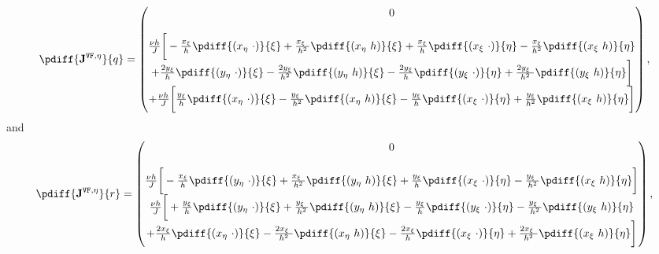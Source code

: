 \begin{align}
	\pdiff{\mathbf{J}^{\texttt{VF},\eta}}{q}=
		\begin{pmatrix}
	0 \\
	\\
	\frac{\nu h}{J} \bigg[
	- \frac{x_{\xi} }{h}\pdiff{(x_{\eta}\ \cdot)}{\xi}
	+ \frac{x_{\xi}\ }{h^2}\pdiff{(x_{\eta}\ h)}{\xi}
	+ \frac{x_{\xi}}{h} \pdiff{(x_{\xi}\ \cdot)}{\eta}
	- \frac{x_{\xi}}{h^2}\pdiff{(x_{\xi}\ h)}{\eta}\\
	+ \frac{2 y_{\xi}}{h} \pdiff{(y_{\eta}\ \cdot)}{\xi}
	- \frac{2 y_{\xi}}{h^2} \pdiff{(y_{\eta}\ h)}{\xi}
	- \frac{2 y_{\xi}}{h} \pdiff{(y_{\xi}\ \cdot)}{\eta}
	+ \frac{2 y_{\xi}\ }{h^2} \pdiff{(y_{\xi}\ h)}{\eta}
	\bigg]\\
	+\frac{\nu h}{J} \bigg[
	\frac{y_{\xi} }{h} \pdiff{(x_{\eta}\ \cdot)}{\xi}
	- \frac{y_{\xi}\ }{h^2} \pdiff{(x_{\eta}\ h)}{\xi}
	- \frac{y_{\xi}}{h} \pdiff{(x_{\xi}\ \cdot)}{\eta}
	+ \frac{y_{\xi}}{h^2} \pdiff{(x_{\xi}\ h)}{\eta}
	\bigg]
\end{pmatrix},
\end{align}
%
and
%
\begin{align}
	\pdiff{\mathbf{J}^{\texttt{VF},\eta}}{r}=
		\begin{pmatrix}
	0 \\
	\\
	\frac{\nu h}{J} \bigg[
	- \frac{x_{\xi}}{h} \pdiff{(y_{\eta}\ \cdot)}{\xi}
	+ \frac{x_{\xi}\ }{h^2}\pdiff{(y_{\eta}\ h)}{\xi}
	+ \frac{y_{\xi}}{h} \pdiff{(x_{\xi}\ \cdot)}{\eta}
	- \frac{y_{\xi}\ }{h^2} \pdiff{(x_{\xi}\ h)}{\eta}
	\bigg]\\
	\frac{\nu h}{J} \bigg[
	+ \frac{y_{\xi} }{h} \pdiff{(y_{\eta}\ \cdot)}{\xi}
	+ \frac{y_{\xi}\ }{h^2} \pdiff{(y_{\eta}\ h)}{\xi}
	- \frac{y_{\xi}}{h} \pdiff{(y_{\xi}\ \cdot)}{\eta}
	- \frac{y_{\xi}\ }{h^2} \pdiff{(y_{\xi}\ h)}{\eta} \\
	+ \frac{2 x_{\xi}}{h} \pdiff{(x_{\eta}\ \cdot)}{\xi}
	- \frac{2 x_{\xi}\ }{h^2} \pdiff{(x_{\eta}\ h)}{\xi}
	- \frac{2 x_{\xi}}{h} \pdiff{(x_{\xi}\ \cdot)}{\eta}
	+ \frac{2 x_{\xi}\ }{h^2} \pdiff{(x_{\xi}\ h)}{\eta}
	\bigg]
\end{pmatrix},
\end{align}
